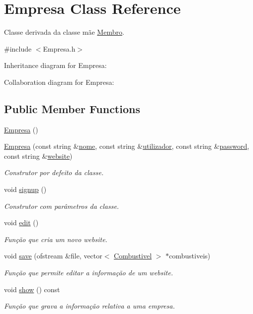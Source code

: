 \hypertarget{class_empresa}{\section{Empresa Class Reference}
\label{class_empresa}
}


Classe derivada da classe mãe \hyperlink{class_membro}{Membro}.  




{\ttfamily \#include $<$Empresa.\+h$>$}



Inheritance diagram for Empresa\+:


Collaboration diagram for Empresa\+:
\subsection*{Public Member Functions}
\begin{DoxyCompactItemize}
\item 
\hyperlink{class_empresa_aff124b958356c479ab50ddf4cf302193}{Empresa} ()
\item 
\hyperlink{class_empresa_a8d57f5422b13a48395f63d82a51bede5}{Empresa} (const string \&\hyperlink{class_membro_a2598bbe34ae32a98f41468b2202a9555}{nome}, const string \&\hyperlink{class_membro_a42cc733ff94ec8d1bbfdacc62dfbb0e7}{utilizador}, const string \&\hyperlink{class_membro_ae2b12fc3e91efc674c07e735edf4ac21}{password}, const string \&\hyperlink{class_empresa_a809624b98d1db18f8627ce2fa394dddd}{website})
\begin{DoxyCompactList}\small\item\em Construtor por defeito da classe. \end{DoxyCompactList}\item 
void \hyperlink{class_empresa_a93293b79b5b56973c3a3d3880d325c14}{signup} ()
\begin{DoxyCompactList}\small\item\em Construtor com parâmetros da classe. \end{DoxyCompactList}\item 
void \hyperlink{class_empresa_a97feeb44a837e086f7aa92f8c9a1ea10}{edit} ()
\begin{DoxyCompactList}\small\item\em Função que cria um novo website. \end{DoxyCompactList}\item 
void \hyperlink{class_empresa_a508c9c178a2933255eadc7955d3f8089}{save} (ofstream \&file, vector$<$ \hyperlink{class_combustivel}{Combustivel} $>$ $\ast$combustiveis)
\begin{DoxyCompactList}\small\item\em Função que permite editar a informação de um website. \end{DoxyCompactList}\item 
void \hyperlink{class_empresa_a707dc497843f63a2d094fb6871fa5b7d}{show} () const 
\begin{DoxyCompactList}\small\item\em Função que grava a informação relativa a uma empresa. \end{DoxyCompactList}\end{DoxyCompactItemize}
